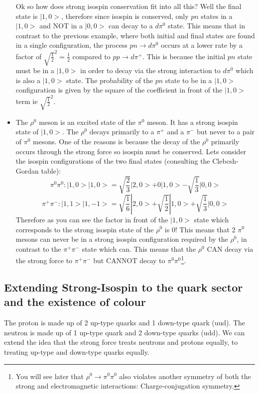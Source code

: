 \begin{itemize}
Ok so how does strong isospin conservation fit into all this? Well the final state is $|1,0>$, therefore since isospin is conserved, only $pn$ states in a $|1,0>$ and NOT in a $|0,0>$ can decay to a $d\pi^0$ state. This means that in contrast to the previous example, where both initial and final states are found in a single configuration, the process $pn\to d\pi^0$ occurs at a lower rate by a factor of $\sqrt{\frac{1}{2}}^2=\frac{1}{2}$ compared to $pp\to d\pi^+$.
This is because the initial $pn$ state must be in a $|1,0>$ in order to decay via the strong interaction to $d\pi^0$ which is also a $|1,0>$ state. The probability of the $pn$ state to be in a $|1,0>$ configuration is given by the square of the coefficient in front of the $|1,0>$ term ie
$\sqrt{\frac{1}{2}}^2$.
\item The $\rho^0$ meson is an excited state of the $\pi^0$ meson. It has a strong isospin state of $|1,0>$. The $\rho^0$ decays primarily to a $\pi^+$ and a $\pi^-$ but never to a pair of $\pi^0$ mesons. One of the reasons is because the decay of the $\rho^0$ primarily occurs through the strong force so isospin must be conserved. Lets consider the isospin configurations of the two final states (consulting the Clebcsh-Gordan table):
\[
\pi^0\pi^0: |1,0>|1,0> =\sqrt{\frac{2}{3}}|2,0>+0|1,0>-\sqrt{\frac{1}{3}}|0,0>
\]
\[
\pi^+\pi^-: |1,1>|1,-1> =\sqrt{\frac{1}{6}}|2,0>+\sqrt{\frac{1}{2}}|1,0>+\sqrt{\frac{1}{3}}|0,0>
\]
Therefore as you can see the factor in front of the $|1,0>$ state which corresponds to the strong isospin state of the $\rho^0$ is 0! This means that 2 $\pi^0$ mesons can never be in a strong isospin configuration required by the $\rho^0$, in contrast to the $\pi^+\pi^-$ state which can. This means that the $\rho^0$ CAN decay via the strong force to $\pi^+\pi^-$ but CANNOT decay to  $\pi^0\pi^0$\footnote{You will see later that $\rho^0\to\pi^0\pi^0$ also violates another symmetry of both the strong and electromagnetic interactions: Charge-conjugation symmetry.}.

\end{itemize}

\subsection{Extending Strong-Isospin to the quark sector and the existence of colour}
\label{sec:isospinQuarks}
The proton is made up of 2 up-type quarks and 1 down-type quark (uud).
The neutron is made up of 1 up-type quark and 2 down-type quarks (udd).
We can extend the idea that the strong force treats neutrons and protons equally,
to treating up-type and down-type quarks equally. 

